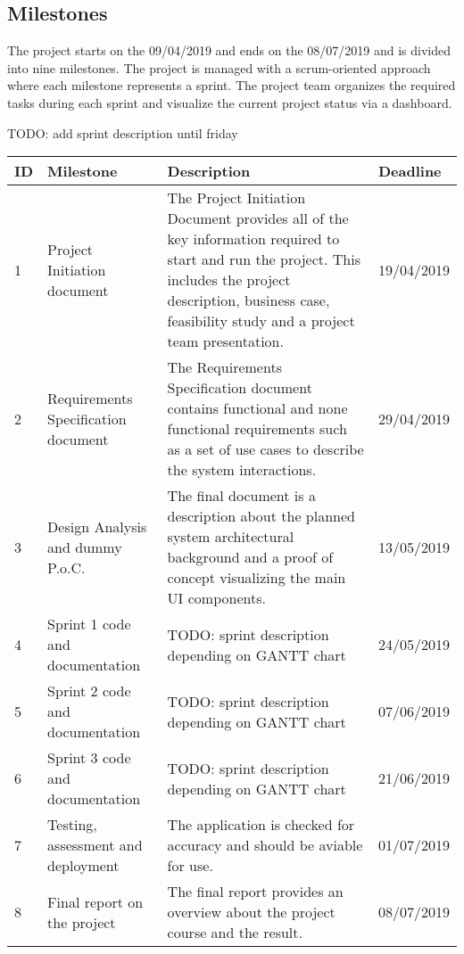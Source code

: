 \documentclass[notitlepage]{article}
\begin{document}
\begin{flushleft}
\subsection{Milestones}

The project starts on the 09/04/2019 and ends on the 08/07/2019 and is divided into nine milestones. The project is managed with a scrum-oriented approach
where each milestone represents a sprint. The project team organizes the required tasks during each sprint and visualize the current project status via a dashboard.

{\color{red} TODO: add sprint description until friday} \\
\begin{center}
  \begin{tabular}{ m{0.4cm} m{5cm} m{8.5cm} m{2cm} }
  	\hline
		ID & Milestone & Description & Deadline \\ \hline
		1 & Project Initiation document & The Project Initiation Document provides all of the key information required to start and run the project. This includes the project description, business case, feasibility study and a project team presentation.  & 19/04/2019 \\ \hline
		2 & Requirements Specification document & The Requirements Specification document contains functional and none functional requirements such as a set of use cases to describe the system interactions. & 29/04/2019 \\ \hline
		3 & Design Analysis and dummy P.o.C. & The final document is a description about the planned system architectural background and a proof of concept visualizing the main UI components. & 13/05/2019 \\ \hline
		4 & Sprint 1 code and documentation & {\color{red} TODO: sprint description depending on GANTT chart}  & 24/05/2019 \\ \hline
		5 & Sprint 2 code and documentation & {\color{red} TODO: sprint description depending on GANTT chart} & 07/06/2019 \\ \hline
		6 & Sprint 3 code and documentation & {\color{red} TODO: sprint description depending on GANTT chart} & 21/06/2019 \\ \hline
		7 & Testing, assessment and deployment & The application is checked for accuracy and should be aviable for use. & 01/07/2019 \\ \hline
		8 & Final report on the project & The final report provides an overview about the project course and the result. & 08/07/2019 \\ \hline
	\end{tabular}
\end{center}


\end{flushleft}
\end{document}
